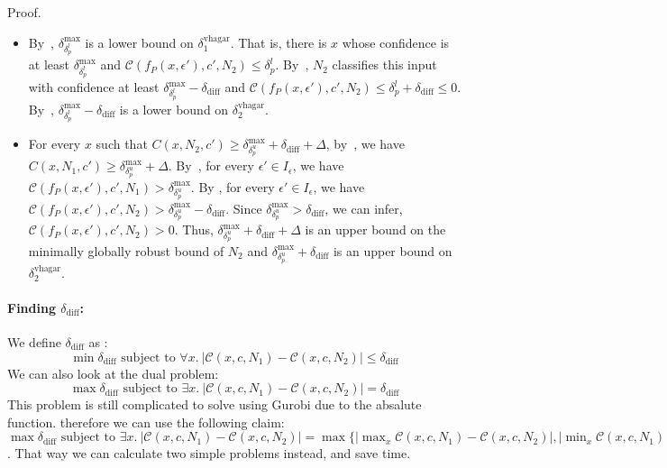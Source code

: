 \documentclass[11pt]{article}
\begin{document}
 Proof. \begin{itemize}
   \item 
 By~, ${\delta^\text{max}_{\delta^l_p}}$ is a lower bound on $\delta^\text{vhagar}_1$.
 That is, there is $x$ whose confidence is at least ${\delta^\text{max}_{\delta^l_p}}$
 and $\mathcal{C}(f_P(x,\epsilon'),c',N_2)\leq {\delta^l_p}$.
 By~, $N_2$ classifies this input with confidence at least ${\delta^\text{max}_{\delta^l_p}}-\delta_\text{diff}$
 and $\mathcal{C}(f_P(x,\epsilon'),c',N_2)\leq {\delta^l_p}+\delta_\text{diff}\leq 0$.
 By~, ${\delta^\text{max}_{\delta^l_p}}-\delta_\text{diff}$ is a lower bound on $\delta^\text{vhagar}_2$.
 \item %
 For every $x$ such that $C(x,N_2,c')\geq {\delta^\text{max}_{\delta^u_p}} + \delta_\text{diff} +\Delta$, by~, we have
  $C(x,N_1,c')\geq {\delta^\text{max}_{\delta^u_p}} +\Delta$. By~, for every $\epsilon'\in I_\epsilon$, we have $\mathcal{C}(f_P(x,\epsilon'),c',N_1)>{\delta^\text{max}_{\delta^u_p}}$. 
 By , for every $\epsilon'\in I_\epsilon$, we have $\mathcal{C}(f_P(x,\epsilon'),c',N_2)>{\delta^\text{max}_{\delta^u_p}}-\delta_\text{diff}$. 
 Since ${\delta^\text{max}_{\delta^u_p}}>\delta_\text{diff}$, 
 we can infer, $\mathcal{C}(f_P(x,\epsilon'),c',N_2)>0$. Thus, ${\delta^\text{max}_{\delta^u_p}} + \delta_\text{diff} +\Delta$ is an upper bound on the minimally globally robust bound of $N_2$ and ${\delta^\text{max}_{\delta^u_p}} + \delta_\text{diff}$ is an upper bound on  $\delta^\text{vhagar}_2$.
 \end{itemize}
 
 
 \paragraph{Finding $\delta_\text{diff}$:}
 We define $\delta_\text{diff}$ as :
 $$\min \delta_\text{diff}\text{ subject to } \forall x.\ |\mathcal{C}(x,c,N_1)-\mathcal{C}(x,c,N_2)|\leq \delta_\text{diff}$$
 We can also look at the dual problem:
 $$\max \delta_\text{diff}\text{ subject to } \exists x.\ |\mathcal{C}(x,c,N_1)-\mathcal{C}(x,c,N_2)|=\delta_\text{diff}$$
 This problem is still complicated to solve using Gurobi due to the absalute function. therefore we can use the following claim:
 $\max \delta_\text{diff}\text{ subject to } \exists x.\ |\mathcal{C}(x,c,N_1)-\mathcal{C}(x,c,N_2)|= \max \{|\max_x \mathcal{C}(x,c,N_1)-\mathcal{C}(x,c,N_2)|,|\min_x \mathcal{C}(x,c,N_1)-\mathcal{C}(x,c,N_2)|\}=\delta_\text{diff}$. That way we can calculate two simple problems instead, and save time.
 
\end{document}
